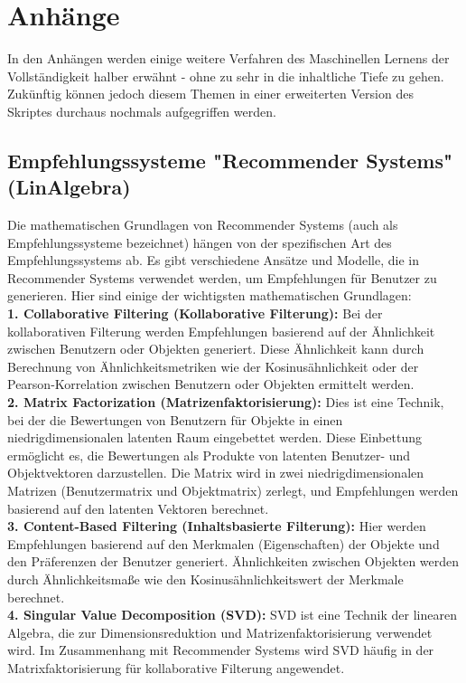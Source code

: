 \documentclass[12pt]{article}
\begin{document}
\section{Anhänge}

In den Anhängen werden einige weitere Verfahren des Maschinellen Lernens der Vollständigkeit halber erwähnt - ohne zu sehr in die inhaltliche Tiefe zu gehen. Zukünftig können jedoch diesem Themen in einer erweiterten Version des Skriptes durchaus nochmals aufgegriffen werden. 

\subsection{Empfehlungssysteme "Recommender Systems" (LinAlgebra)}
Die mathematischen Grundlagen von Recommender Systems (auch als Empfehlungssysteme bezeichnet) hängen von der spezifischen Art des Empfehlungssystems ab. Es gibt verschiedene Ansätze und Modelle, die in Recommender Systems verwendet werden, um Empfehlungen für Benutzer zu generieren. Hier sind einige der wichtigsten mathematischen Grundlagen:\\[0.3cm]
%
\textbf{1. Collaborative Filtering (Kollaborative Filterung):} Bei der kollaborativen Filterung werden Empfehlungen basierend auf der Ähnlichkeit zwischen Benutzern oder Objekten generiert. Diese Ähnlichkeit kann durch Berechnung von Ähnlichkeitsmetriken wie der Kosinusähnlichkeit oder der Pearson-Korrelation zwischen Benutzern oder Objekten ermittelt werden.\\
%
\textbf{2. Matrix Factorization (Matrizenfaktorisierung):} Dies ist eine Technik, bei der die Bewertungen von Benutzern für Objekte in einen niedrigdimensionalen latenten Raum eingebettet werden. Diese Einbettung ermöglicht es, die Bewertungen als Produkte von latenten Benutzer- und Objektvektoren darzustellen. Die Matrix wird in zwei niedrigdimensionalen Matrizen (Benutzermatrix und Objektmatrix) zerlegt, und Empfehlungen werden basierend auf den latenten Vektoren berechnet.\\
%
\textbf{3. Content-Based Filtering (Inhaltsbasierte Filterung):} Hier werden Empfehlungen basierend auf den Merkmalen (Eigenschaften) der Objekte und den Präferenzen der Benutzer generiert. Ähnlichkeiten zwischen Objekten werden durch Ähnlichkeitsmaße wie den Kosinusähnlichkeitswert der Merkmale berechnet.\\
%
\textbf{4. Singular Value Decomposition (SVD):} SVD ist eine Technik der linearen Algebra, die zur Dimensionsreduktion und Matrizenfaktorisierung verwendet wird. Im Zusammenhang mit Recommender Systems wird SVD häufig in der Matrixfaktorisierung für kollaborative Filterung angewendet.\\
\end{document}
